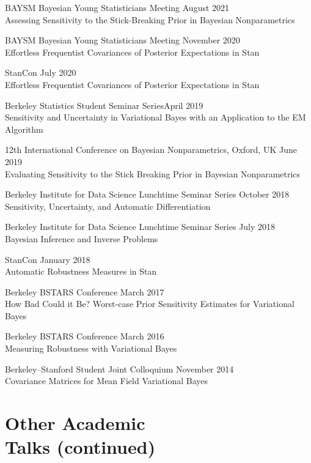 \documentclass[margin,line]{res}
\begin{document}
\begin{resume}
BAYSM Bayesian Young Statisticians Meeting
\hfill August 2021\\
Assessing Sensitivity to the Stick-Breaking Prior in Bayesian Nonparametrics

BAYSM Bayesian Young Statisticians Meeting
\hfill November 2020\\
Effortless Frequentist Covariances of Posterior Expectations in Stan

StanCon \hfill July 2020\\
Effortless Frequentist Covariances of Posterior Expectations in Stan

Berkeley Statistics Student Seminar Series\hfill April 2019\\
Sensitivity and Uncertainty in Variational Bayes with an Application to the
EM Algorithm

12th International Conference on Bayesian Nonparametrics, Oxford, UK
\hfill June 2019\\
Evaluating Sensitivity to the Stick Breaking Prior in Bayesian Nonparametrics

Berkeley Institute for Data Science Lunchtime Seminar Series \hfill October 2018\\
Sensitivity, Uncertainty, and Automatic Differentiation

Berkeley Institute for Data Science Lunchtime Seminar Series \hfill July 2018\\
Bayesian Inference and Inverse Problems

StanCon \hfill January 2018\\
Automatic Robustness Measures in Stan


Berkeley BSTARS Conference \hfill March 2017\\
How Bad Could it Be?  Worst-case Prior Sensitivity Estimates for Variational Bayes

Berkeley BSTARS Conference \hfill March 2016\\
Measuring Robustness with Variational Bayes

Berkeley--Stanford Student Joint Colloquium \hfill November 2014\\
Covariance Matrices for Mean Field Variational Bayes

\section{\sc Other Academic\\Talks (continued)}


\end{resume}
\end{document}
